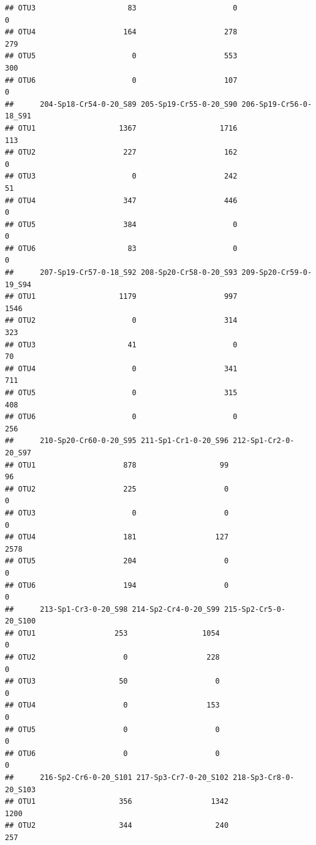 \documentclass[]{article}
\begin{document}
\begin{verbatim}
## OTU3                     83                      0                      0
## OTU4                    164                    278                    279
## OTU5                      0                    553                    300
## OTU6                      0                    107                      0
##      204-Sp18-Cr54-0-20_S89 205-Sp19-Cr55-0-20_S90 206-Sp19-Cr56-0-18_S91
## OTU1                   1367                   1716                    113
## OTU2                    227                    162                      0
## OTU3                      0                    242                     51
## OTU4                    347                    446                      0
## OTU5                    384                      0                      0
## OTU6                     83                      0                      0
##      207-Sp19-Cr57-0-18_S92 208-Sp20-Cr58-0-20_S93 209-Sp20-Cr59-0-19_S94
## OTU1                   1179                    997                   1546
## OTU2                      0                    314                    323
## OTU3                     41                      0                     70
## OTU4                      0                    341                    711
## OTU5                      0                    315                    408
## OTU6                      0                      0                    256
##      210-Sp20-Cr60-0-20_S95 211-Sp1-Cr1-0-20_S96 212-Sp1-Cr2-0-20_S97
## OTU1                    878                   99                   96
## OTU2                    225                    0                    0
## OTU3                      0                    0                    0
## OTU4                    181                  127                 2578
## OTU5                    204                    0                    0
## OTU6                    194                    0                    0
##      213-Sp1-Cr3-0-20_S98 214-Sp2-Cr4-0-20_S99 215-Sp2-Cr5-0-20_S100
## OTU1                  253                 1054                     0
## OTU2                    0                  228                     0
## OTU3                   50                    0                     0
## OTU4                    0                  153                     0
## OTU5                    0                    0                     0
## OTU6                    0                    0                     0
##      216-Sp2-Cr6-0-20_S101 217-Sp3-Cr7-0-20_S102 218-Sp3-Cr8-0-20_S103
## OTU1                   356                  1342                  1200
## OTU2                   344                   240                   257

\end{verbatim}
\end{document}
